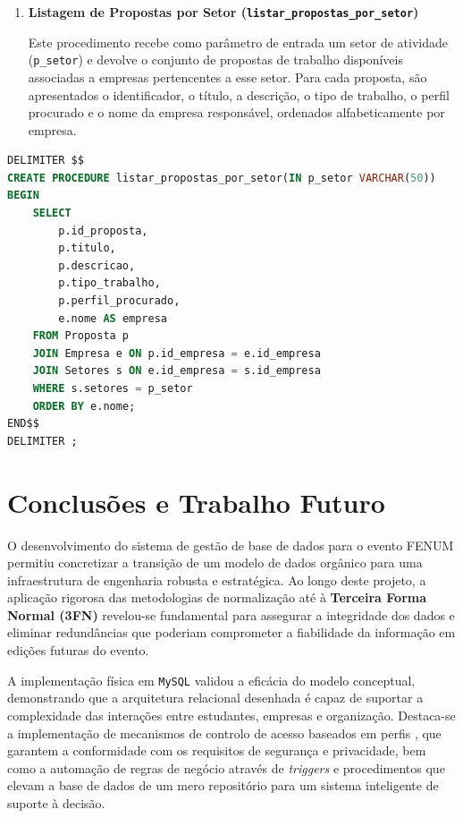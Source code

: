 \documentclass[12pt,a4paper]{article}
\begin{document}
\begin{enumerate}
    \item \textbf{Listagem de Propostas por Setor 
    (\texttt{listar\_propostas\_por\_setor})}
    
    Este procedimento recebe como parâmetro de entrada um setor de atividade
    (\texttt{p\_setor}) e devolve o conjunto de propostas de trabalho
    disponíveis associadas a empresas pertencentes a esse setor. Para cada
    proposta, são apresentados o identificador, o título, a descrição, o tipo de
    trabalho, o perfil procurado e o nome da empresa responsável, ordenados
    alfabeticamente por empresa.
\end{enumerate}

\begin{lstlisting}[language=SQL,caption={Criação do procedimento listar\_propostas\_por\_setor}, label={lst:proc}]
DELIMITER $$
CREATE PROCEDURE listar_propostas_por_setor(IN p_setor VARCHAR(50))
BEGIN
    SELECT 
        p.id_proposta,
        p.titulo,
        p.descricao,
        p.tipo_trabalho,
        p.perfil_procurado,
        e.nome AS empresa
    FROM Proposta p
    JOIN Empresa e ON p.id_empresa = e.id_empresa
    JOIN Setores s ON e.id_empresa = s.id_empresa
    WHERE s.setores = p_setor
    ORDER BY e.nome;
END$$
DELIMITER ;
\end{lstlisting}

\section{Conclusões e Trabalho Futuro}

O desenvolvimento do sistema de gestão de base de dados para o evento FENUM permitiu concretizar a transição de um modelo de dados orgânico para uma infraestrutura de engenharia robusta e estratégica. Ao longo deste projeto, a aplicação rigorosa das metodologias de normalização até à \textbf{Terceira Forma Normal (3FN)} revelou-se fundamental para assegurar a integridade dos dados e eliminar redundâncias que poderiam comprometer a fiabilidade da informação em edições futuras do evento.

A implementação física em \texttt{MySQL} validou a eficácia do modelo conceptual, demonstrando que a arquitetura relacional desenhada é capaz de suportar a complexidade das interações entre estudantes, empresas e organização. Destaca-se a implementação de mecanismos de controlo de acesso baseados em perfis , que garantem a conformidade com os requisitos de segurança e privacidade, bem como a automação de regras de negócio através de \textit{triggers} e procedimentos que elevam a base de dados de um mero repositório para um sistema inteligente de suporte à decisão.
\end{document}
